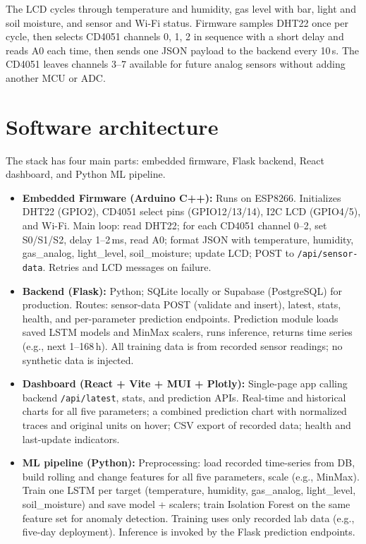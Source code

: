 \documentclass[journal,onecolumn]{IEEEtran}
\begin{document}
The LCD cycles through temperature and humidity, gas level with bar, light and soil moisture, and sensor and Wi-Fi status. Firmware samples DHT22 once per cycle, then selects CD4051 channels 0, 1, 2 in sequence with a short delay and reads A0 each time, then sends one JSON payload to the backend every 10\,s. The CD4051 leaves channels 3--7 available for future analog sensors without adding another MCU or ADC.

\section{Software architecture}
The stack has four main parts: embedded firmware, Flask backend, React dashboard, and Python ML pipeline.

\begin{itemize}
    \item \textbf{Embedded Firmware (Arduino C++):} Runs on ESP8266. Initializes DHT22 (GPIO2), CD4051 select pins (GPIO12/13/14), I2C LCD (GPIO4/5), and Wi-Fi. Main loop: read DHT22; for each CD4051 channel 0--2, set S0/S1/S2, delay 1--2\,ms, read A0; format JSON with temperature, humidity, gas\_analog, light\_level, soil\_moisture; update LCD; POST to \texttt{/api/sensor-data}. Retries and LCD messages on failure.
    \item \textbf{Backend (Flask):} Python; SQLite locally or Supabase (PostgreSQL) for production. Routes: sensor-data POST (validate and insert), latest, stats, health, and per-parameter prediction endpoints. Prediction module loads saved LSTM models and MinMax scalers, runs inference, returns time series (e.g., next 1--168\,h). All training data is from recorded sensor readings; no synthetic data is injected.
    \item \textbf{Dashboard (React + Vite + MUI + Plotly):} Single-page app calling backend \texttt{/api/latest}, stats, and prediction APIs. Real-time and historical charts for all five parameters; a combined prediction chart with normalized traces and original units on hover; CSV export of recorded data; health and last-update indicators.
    \item \textbf{ML pipeline (Python):} Preprocessing: load recorded time-series from DB, build rolling and change features for all five parameters, scale (e.g., MinMax). Train one LSTM per target (temperature, humidity, gas\_analog, light\_level, soil\_moisture) and save model + scalers; train Isolation Forest on the same feature set for anomaly detection. Training uses only recorded lab data (e.g., five-day deployment). Inference is invoked by the Flask prediction endpoints.
\end{itemize}
\end{document}
